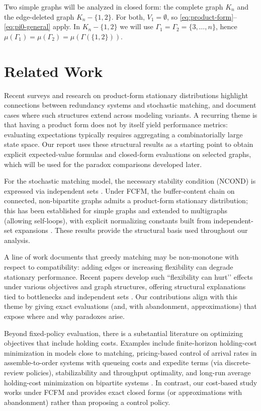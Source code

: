 \documentclass[11pt]{article}
\begin{document}
{Two simple graphs will be analyzed in closed form: the complete graph $K_n$ and the edge-deleted graph $K_n-\{1,2\}$.
For both, $V_1=\emptyset$, so \eqref{eq:product-form}–\eqref{eq:pi0-general} apply.
In $K_n-\{1,2\}$ we will use $\Gamma_1=\Gamma_2=\{3,\dots,n\}$, hence $\mu(\Gamma_1)=\mu(\Gamma_2)=\mu(\Gamma(\{1,2\}))$.

\section{Related Work}\label{sec:related}

Recent surveys and research on product-form stationary distributions highlight connections between redundancy systems and stochastic matching, and document cases where such structures extend across modeling variants. A recurring theme is that having a product form does not by itself yield performance metrics: evaluating expectations typically requires aggregating a combinatorially large state space. Our report uses these structural results as a starting point to obtain explicit expected-value formulas and closed-form evaluations on selected graphs, which will be used for the paradox comparisons developed later.

For the stochastic matching model, the necessary stability condition (\textsc{NCOND}) is expressed via independent sets \cite{MaMo18}. Under \textsc{FCFM}, the buffer-content chain on connected, non-bipartite graphs admits a product-form stationary distribution; this has been established for simple graphs and extended to multigraphs (allowing self-loops), with explicit normalizing constants built from independent-set expansions \cite{MBMa21,BMMR20}. These results provide the structural basis used throughout our analysis.

A line of work documents that greedy matching may be non-monotone with respect to compatibility: adding edges or increasing flexibility can degrade stationary performance. Recent papers develop such “flexibility can hurt’’ effects under various objectives and graph structures, offering structural explanations tied to bottlenecks and independent sets \cite{BCDF24,CDFB21}. Our contributions align with this theme by giving exact evaluations (and, with abandonment, approximations) that expose where and why paradoxes arise.

Beyond fixed-policy evaluation, there is a substantial literature on optimizing objectives that include holding costs. Examples include finite-horizon holding-cost minimization in models close to matching, pricing-based control of arrival rates in assemble-to-order systems with queueing costs and expedite terms (via discrete-review policies), stabilizability and throughput optimality, and long-run average holding-cost minimization on bipartite systems \cite{gurvich2014,BGMa13,nazari2019}. In contrast, our cost-based study works under \textsc{FCFM} and provides exact closed forms (or approximations with abandonment) rather than proposing a control policy.

}
\end{document}
